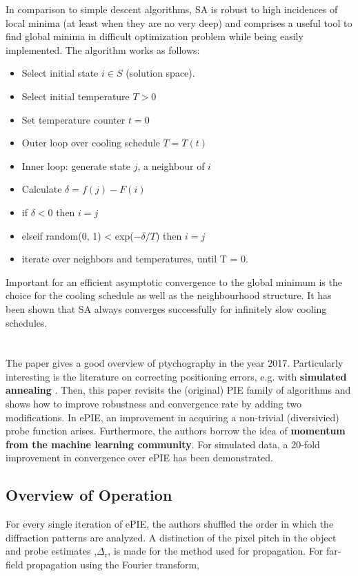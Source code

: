 \documentclass{article}
\begin{document}
In comparison to simple descent algorithms, SA is robust to high incidences of local minima (at least when they are no very deep) and comprises a useful tool to find global minima in difficult optimization problem while being easily implemented. The algorithm works as follows:

\begin{itemize}
    \item Select initial state $i \in S$ (solution space).
    \item Select initial temperature $T>0$
    \item Set temperature counter $t = 0$
    \item Outer loop over cooling schedule $T = T(t)$
    \item Inner loop: generate state $j$, a neighbour of $i$
    \item Calculate $\delta = f(j) - F(i)$
    \item if $\delta < 0$ then $i = j$
    \item elseif random(0, 1) < exp($-\delta/T$) then $i = j$
    \item iterate over neighbors and temperatures, until T = 0.
\end{itemize}

Important for an efficient asymptotic convergence to the global minimum is the choice for the cooling schedule as well as the neighbourhood structure. 
It has been shown that SA always converges successfully for infinitely slow cooling schedules.


\section{\cite{Maiden2017-iz} }

The paper gives a good overview of ptychography in the year 2017. Particularly interesting is the literature on correcting positioning errors, e.g. with \textbf{simulated annealing} \cite{Maiden2012-bj}. Then, this paper revisits the (original) PIE family of algorithms and shows how to improve robustness and convergence rate by adding two modifications. In ePIE, an improvement in acquiring a non-trivial (diversivied) probe function arises. Furthermore, the authors borrow the idea of \textbf{momentum from the machine learning community}. For simulated data, a 20-fold improvement in convergence over ePIE has been demonstrated.

\subsection{Overview of Operation}
For every single iteration of ePIE, the authors shuffled the order in which the diffraction patterns are analyzed. A distinction of the pixel pitch in the object and probe estimates ,$\Delta_\mathrm{r}$, is made for the method used for propagation.
For far-field propagation using the Fourier transform,
\end{document}
